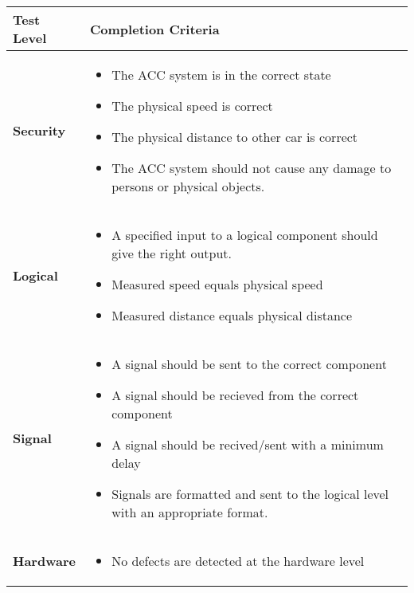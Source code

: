 		\begin{table}[H]
			\begin{tabular}{ p{2cm} | p{11cm} }
				\hline
				{\bf Test Level} & {\bf Completion Criteria} \\ \hline
				{\bf Security} & 
					\begin{itemize}
						\item The ACC system is in the correct state
 						\item The physical speed is correct
						\item The physical distance to other car is correct 
						\item The ACC system should not cause any damage to persons or physical objects.
					\end{itemize}
				\\ \hline

				{\bf Logical} & 
					\begin{itemize}
						\item A specified input to a logical component should give the right output.
						\item Measured speed equals physical speed 
						\item Measured distance equals physical distance
					\end{itemize}
				\\ \hline

				{\bf Signal} &
				 \begin{itemize}
						\item A signal should be sent to the correct component
						\item A signal should be recieved from the correct component
						\item A signal should be recived/sent with a minimum delay
						\item Signals are formatted and sent to the logical level with an appropriate format.
					\end{itemize}
				\\ \hline

 				{\bf Hardware} & 
 					\begin{itemize}
						\item No defects are detected at the hardware level
					\end{itemize}
 				\\ \hline
			\end{tabular}
		\end{table}
